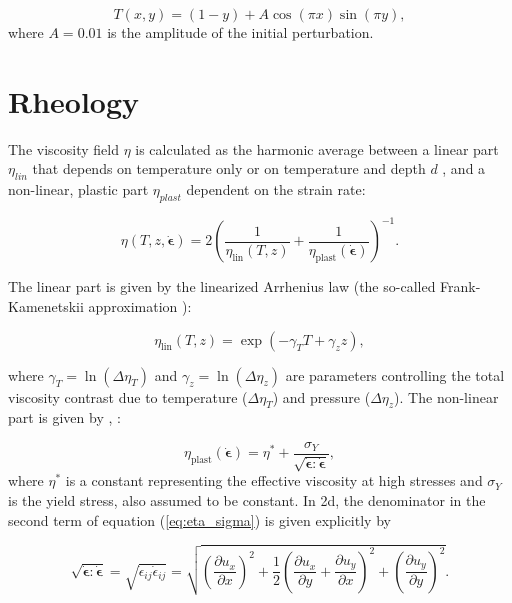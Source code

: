 \begin{equation}
T(x,y) = (1-y) + A \cos(\pi x)\sin(\pi y), \label{eq:initemp}
\end{equation}
where $A=0.01$ is the amplitude of the initial perturbation.

\section*{Rheology}

The viscosity field $\eta$ is calculated as the harmonic average between a linear part $\eta_{lin}$ 
that depends on temperature only or on temperature and depth $d$ , and a non-linear,
plastic part $\eta_{plast}$ dependent on the strain rate:

\begin{equation}
\eta(T,z,\dot{\boldsymbol{\epsilon}}) = 
2 \left(\frac{1}{\eta_\text{lin}(T,z)} + \frac{1}{\eta_\text{plast}(\dot{\boldsymbol{\epsilon}})} \right)^{-1}. 
\label{eq:eta}
\end{equation}

The linear part is given by the linearized Arrhenius law 
(the so-called Frank-Kamenetskii approximation \cite{fran69}):

\begin{equation}
\eta_\text{lin} (T,z) = \exp(-\gamma_T T + \gamma_{z} z), \label{eq:eta_Ty}
\end{equation}

where $\gamma_T = \ln ( \Delta\eta_T)$ and $\gamma_{z}=\ln(\Delta\eta_{z})$ are parameters 
controlling the total viscosity 
contrast due to temperature ($\Delta\eta_T$) and pressure ($\Delta\eta_{z}$). 
The non-linear part is given by \textcite{trha98}, \textcite{trha98b}: 

\begin{equation}
\eta_\text{plast} (\dot{\boldsymbol{\epsilon}}) 
= \eta^{*} + \frac{\sigma_Y}{\sqrt{\dot{\boldsymbol{\epsilon}}:\dot{\boldsymbol{\epsilon}}}}, \label{eq:eta_sigma}
\end{equation}
where $\eta^*$ is a constant representing the effective viscosity at high stresses 
\cite{stlh14} and $\sigma_Y$ is the yield stress, also assumed to be constant. 
In 2d, the denominator in the second term of equation (\ref{eq:eta_sigma}) is given explicitly by

\begin{equation}
\sqrt{\dot{\boldsymbol{\epsilon}}:\dot{\boldsymbol{\epsilon}}} 
= \sqrt{\dot{\epsilon}_{ij} \dot{\epsilon}_{ij} } 
= \sqrt{\left( \frac{\partial u_x}{\partial x} \right)^2 + \frac{1}{2} \left( \frac{\partial u_x}{\partial y} 
+ \frac{\partial u_y}{\partial x} \right)^2 + \left( \frac{\partial u_y}{\partial y} \right)^2  }.
\end{equation}


